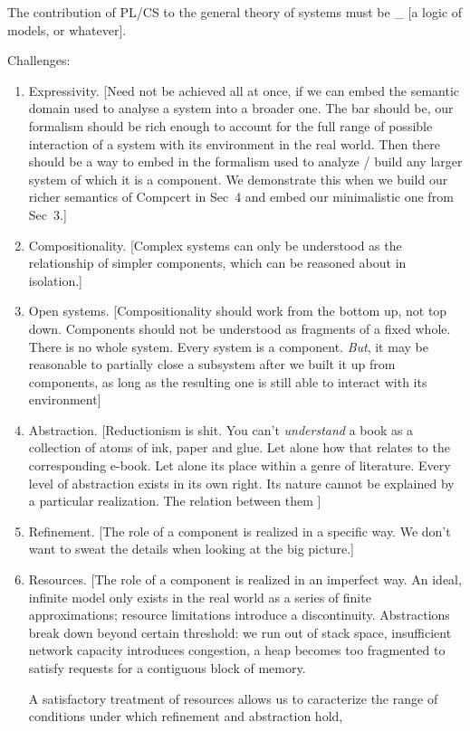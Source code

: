 \documentclass[sigplan,10pt,review,anonymous]{acmart}
\begin{document}
The contribution of PL/CS to the general theory of systems
must be \_ [a logic of models, or whatever].

Challenges:
\begin{enumerate}
\item Expressivity.
  [Need not be achieved all at once,
  if we can embed the semantic domain used to analyse a system
  into a broader one.
  The bar should be,
  our formalism should be rich enough to account for
  the full range of possible interaction of a system with its environment
  in the real world.
  Then there should be a way to embed in the formalism
  used to analyze / build any larger system of which it is a component.
  We demonstrate this when we build our richer semantics of Compcert in Sec~4
  and embed our minimalistic one from Sec~3.]
\item Compositionality.
  [Complex systems can only be understood
  as the relationship of simpler components,
  which can be reasoned about in isolation.]
\item Open systems.
  [Compositionality should work from the bottom up, not top down.
  Components should not be understood as fragments of a fixed whole.
  There is no whole system.
  Every system is a component.
  \emph{But},
  it may be reasonable to partially close a subsystem
  after we built it up from components,
  as long as the resulting one
  is still able to interact with its environment]
\item Abstraction.
  [Reductionism is shit.
  You can't \emph{understand} a book
  as a collection of atoms of ink, paper and glue.
  Let alone how that relates to the corresponding e-book.
  Let alone its place within a genre of literature.
  Every level of abstraction exists in its own right.
  Its nature cannot be explained by a particular realization.
  The relation between them ]
\item Refinement.
  [The role of a component is realized in a specific way.
  We don't want to sweat the details when looking at the big picture.]
\item Resources.
  [The role of a component is realized in an imperfect way.
  An ideal, infinite model only exists in the real world
  as a series of finite approximations;
  resource limitations introduce a discontinuity.
  Abstractions break down beyond certain threshold:
  we run out of stack space,
  insufficient network capacity introduces congestion,
  a heap becomes too fragmented to satisfy
  requests for a contiguous block of memory.

  A satisfactory treatment of resources
  allows us to caracterize the range of conditions
  under which refinement and abstraction hold,
\end{enumerate}
\end{document}
